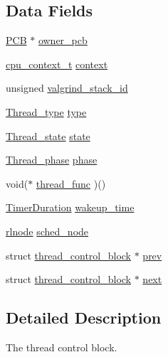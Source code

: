 \subsection*{Data Fields}
\begin{DoxyCompactItemize}
\item 
\hyperlink{group__proc_gadf327f09ee935cf1734c14e8849f0421}{P\+CB} $\ast$ \hyperlink{structthread__control__block_a74aa312623cb8be2bc719d5210b58c04}{owner\+\_\+pcb}
\item 
\hyperlink{bios_8h_a6067c1395a75fc3e17f1ea6353065b54}{cpu\+\_\+context\+\_\+t} \hyperlink{structthread__control__block_a9c107039dffa851dde6edabd6cd3f89c}{context}
\item 
unsigned \hyperlink{structthread__control__block_ad8a2da36c0ad775c12c5f66f4fec9d41}{valgrind\+\_\+stack\+\_\+id}
\item 
\hyperlink{group__scheduler_ga18795bc1ab00161fc27ce34b1895fb03}{Thread\+\_\+type} \hyperlink{structthread__control__block_abd0f40bdcb22c701df03f560bbc42d5c}{type}
\item 
\hyperlink{group__scheduler_ga6c969c169777f82c104cf73e501df70f}{Thread\+\_\+state} \hyperlink{structthread__control__block_affd872365cf4768fa1c9bd1e196bb97c}{state}
\item 
\hyperlink{group__scheduler_gab180b4aa356776bddcd724cef4f5deae}{Thread\+\_\+phase} \hyperlink{structthread__control__block_aa7e8e6a00c5f9f25210a49589ad818f8}{phase}
\item 
void($\ast$ \hyperlink{structthread__control__block_a91a73f2ad3f727b7412b912b3d65109a}{thread\+\_\+func} )()
\item 
\hyperlink{bios_8h_ae7291e5cd742fb9bc6d4aaa0d51bd0ee}{Timer\+Duration} \hyperlink{structthread__control__block_a7dbf9ba7df67911abb7951e249f587b6}{wakeup\+\_\+time}
\item 
\hyperlink{group__rlists_ga8f6244877f7ce2322c90525217ea6e7a}{rlnode} \hyperlink{structthread__control__block_add433b079e04053fe70fdd2b92e1d6ad}{sched\+\_\+node}
\item 
struct \hyperlink{structthread__control__block}{thread\+\_\+control\+\_\+block} $\ast$ \hyperlink{structthread__control__block_a605a6e9bb8154b658ee72e193599d180}{prev}
\item 
struct \hyperlink{structthread__control__block}{thread\+\_\+control\+\_\+block} $\ast$ \hyperlink{structthread__control__block_ac6b51ca735291f730ca1d4c335fb9359}{next}
\end{DoxyCompactItemize}


\subsection{Detailed Description}
The thread control block. 

